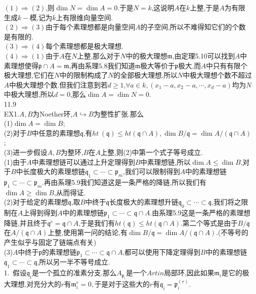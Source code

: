 \documentclass[b5paper]{ctexart}
\begin{document}
$(1)\Rightarrow (2)$,则$\dim N=\dim A=0.$于是$N=k$,这说明$A$在$k$上整,于是$A$为有限生成$k-$模,记为$k$上有限维向量空间.\\
$(2)\Rightarrow (3)$由于每个素理想都是向量空间$A$的子空间,所以不难得知它们的个数是有限的.\\
$(3)\Rightarrow (4)$每个素理想都是极大理想.\\
$(4)\Rightarrow (1)$由于$A$在$N$上整,那么对于$N$中的极大理想$\mathfrak{m}$,由定理5.10可以找到$A$中素理想使得$\mathfrak{p}\cap A=\mathfrak{m}$,再由系理$5.8$我们知道$\mathfrak{m}$极大等价于$\mathfrak{p}$极大,而$A$中只有有限个极大理想,它们在$N$中的限制构成了$N$的全部极大理想.所以$N$中极大理想个数不超过$A$中极大理想个数.但我们注意到若$d\geq 1$,$\forall a\in k,(x_1-a,x_2-a,\cdots,x_d-a)$均为$N$中极大理想,所以$d=0$,那么$\dim A=\dim N=0$.\\
11.9\\
EX1.$A,B$为Noether环,$A\hookrightarrow B$为整性扩张.那么\\
(1)$\dim A=\dim B$;\\
(2)对于$B$中任意的素理想$\mathfrak{q}$,有$ht~(\mathfrak{q})\leq ht(\mathfrak{q}\cap A),\dim B/\mathfrak{q}=\dim A/(\mathfrak{q}\cap A)$;\\
(3)进一步假设$A,B$为整环,$B$在$A$上整,则(2)中第一个式子等号成立.\\
(1)由于$A$中素理想链可以通过上升定理得到$B$中素理想链,所以$\dim A\leq \dim B$,对于$B$中长度极大的素理想链$\mathfrak{q}_1\subset\cdots \subset\mathfrak{p}_m$,我们可以限制得到$A$中的素理想链$\mathfrak{p}_1\subset\cdots\subset\mathfrak{p}_m$.再由系理5.9我们知道这是一条严格的降链,所以我们有$\dim A\geq\dim B$,从而得证.\\
(2)对于给定的素理想$\mathfrak{q}$,取$B$中终于$\mathfrak{q}$长度极大的素理想升链$\mathfrak{q}_0\subset \cdots\subset \mathfrak{q}$,我们将之限制在$A$上得到得到$A$中的素理想链$\mathfrak{p}_1\subset\cdots\subset\mathfrak{q}\cap A$.由系理5.9这是一条严格的素理想降链,并且终于$\mathfrak{q}^c=\mathfrak{q}\cap A$,于是我们有$ht(\mathfrak{q})\leq ht(\mathfrak{q}\cap A)$.第二个等式是由于$B/\mathfrak{q}$在$A/(\mathfrak{q}\cap A)$上整,使用第一问的结论,有$\dim B/\mathfrak{q}=\dim A/(\mathfrak{q}\cap A)$.(不等号的产生似乎与固定了链端点有关)\\
(3)$A$中终于$\mathfrak{p}$的素理想链$\mathfrak{p}_1\subset\cdots\subset\mathfrak{q}\cap A$,都可以使用下降定理得到$B$中的素理想链$\mathfrak{q}_1\subset\cdots\subset\mathfrak{q}$,所以另一半不等号成立.\\
1.~假设$\mathfrak{q}_i$是一个孤立的准素分支.那么$A_{\mathfrak{p}_i}$是一个$Artin$局部环,因此如果$\mathfrak{m}_i$是它的极大理想,对充分大的$r$有$\mathfrak{m}_i^r=0,$于是对于这些大的$r$有$\mathfrak{q}_i=\mathfrak{p}_i^{(r)}$.\\
\end{document}
